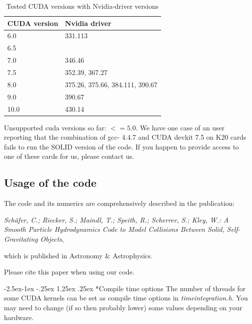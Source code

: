 \documentclass[10pt,fleqn,twoside]{article}
\makeatletter
\renewcommand\paragraph{\@startsection{paragraph}{4}{\z@}%
            {-2.5ex\@plus -1ex \@minus -.25ex}%
            {1.25ex \@plus .25ex}%
            {\normalfont\normalsize\bfseries}}
\makeatother
\begin{document}
\begin{table}
 \begin{center}
  \begin{tabular}[h]{p{5cm} l} \toprule
   CUDA version & Nvidia driver                   \\ \midrule
   6.0          & 331.113                         \\
   6.5          &                                 \\
   7.0          & 346.46                          \\
   7.5          & 352.39, 367.27                  \\
   8.0          & 375.26, 375.66, 384.111, 390.67 \\
   9.0          & 390.67                          \\
   10.0         & 430.14                          \\  \bottomrule
  \end{tabular}
  \caption{Tested CUDA versions with Nvidia-driver versions}
 \end{center}
 Unsupported cuda versions so far: $<= 5.0$. \newline
 We have one case of an user reporting that the combination of gcc- 4.4.7 and CUDA devkit 7.5 on K20 cards fails to run the SOLID version of the code. If you happen to provide access to one of these cards for us, please contact us.
 \label{tab:cuda_driver}
\end{table}


\subsection{Usage of the code}
The code and its numerics are comprehensively described in the publication:

\emph{Schäfer, C.; Riecker, S.; Maindl, T.; Speith, R.; Scherrer, S.; Kley, W.: A Smooth Particle Hydrodynamics Code to Model Collisions Between Solid, Self-Gravitating Objects},

which is published in Astronomy \& Astrophysics.

Please cite this paper when using our code.


\paragraph*{Compile time options}
The number of threads for some CUDA kernels can be set as compile time options in \emph{timeintegration.h}. You may need to change (if so then probably lower) some values depending on your hardware.
\end{document}
